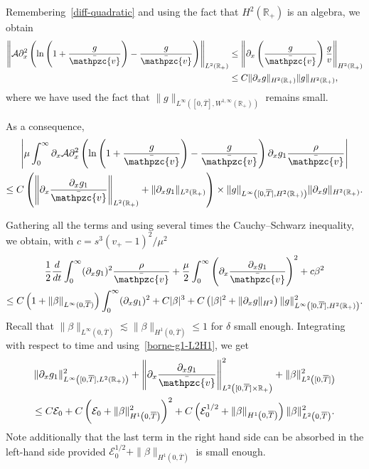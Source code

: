 \documentclass[AHL,Unicode,longabstracts,published]{cedram}
\newcommand{\R}{\mathbb{R}}
\newcommand{\p}{\partial}
\newcommand{\bv}{\bar{\mathpzc{v}}}
\newcommand{\cA}{\mathcal A}
\newcommand{\cE}{\mathcal E}
\begin{document}
\begin{itemize}
Remembering~\eqref{diff-quadratic} and using the fact that $H^2(\R_+)$ is an algebra, we obtain {
\begin{align*}
\left\| \cA \p_x^2 \left(\ln\left(1+ \frac{g}{\bv}\right) - \frac{g}{\bv}\right)\right\|_{L^2(\R_+)}
&\leq \left\| \p_x\left(\frac{g}{\bv}\right) \frac{g}{v}\right\|_{H^2(\R_+)}\\
&\leq C \|\p_x g\|_{H^2(\R_+)} \|g\|_{H^2(\R_+)},
\end{align*}
where we have used the fact that $\|g\|_{L^\infty([0,\overline{T}], W^{1,\infty}(\R_+))}$ remains small. }

As a consequence,
\begin{multline}\label{eq:nonlin-1}
 \left| \mu \int_0^\infty \p_x \cA \p_x^2 \left(\ln\left(1+ \frac{g}{\bv}\right) - \frac{g}{\bv}\right) \p_x g_1 \frac{\rho }{\bv}\right|  \\
\leq C\left(\left\| \p_x \frac{\p_x g_1}{\bv} \right\|_{L^2(\R_+)} + \|\p_x g_1\|_{L^2(\R_+)}\right)\times \| g\|_{L^\infty\left([0, \overline{T}], H^2(\R_+)\right)} \| \p_x g\|_{H^2(\R_+)}.
\end{multline}
\end{itemize}

Gathering all the terms and using several times the Cauchy--Schwarz inequality, we obtain, with $c=s^3(v_+-1)^2/\mu^2$
\begin{multline*}
\frac{1}{2}\frac{d}{dt}\int_0^\infty (\p_x g_1)^2 \frac{\rho}{\bv} + \frac{\mu}{2}\int_0^\infty\left(\p_x \frac{\p_x g_1}{\bv}\right)^2 + c \beta^2\\
\leq C \left(1+ \|\beta\|_{L^\infty(0,\overline{T})}\right)\int_0^\infty (\p_x g_1)^2 + C |\beta|^3 + C \left(|\beta|^2 + \| \p_x g \|_{H^2}\right)\|g\|_{L^\infty\left([0, \overline{T}], H^2(\R_+)\right)}^2.
\end{multline*}
Recall that $\|\beta\|_{L^\infty(0,\overline{T})}\lesssim \|\beta\|_{H^1(0,\overline{T})}\leq 1$ for $\delta$ small enough. Integrating with respect to time and using~\eqref{borne-g1-L2H1}, we get
\begin{multline}\label{est:b}
\|\p_x g_1\|_{L^\infty\left([0,\overline{T}], L^2(\R_+)\right)}^2 + \left\|\p_x \frac{\p_x g_1}{\bv}\right\|^2_{L^2\left([0,\overline{T}]\times \R_+\right)}+ \|\beta\|_{L^2\left([0,\overline{T}]\right)}^2\\
\leq C\cE_0 + C\left(\cE_0 + \|\beta\|_{H^1\left(0,\overline{T}\right)}^2\right)^2 + C\left(\cE_0^{1/2} + \|\beta\|_{H^1\left(0,\overline{T}\right)}\right)\|\beta\|_{L^2\left(0,\overline{T}\right)}^2.
\end{multline}
Note additionally that the last term in the right hand side can be absorbed in the left-hand side provided $\cE_0^{1/2} + \|\beta\|_{H^1(0,\overline{T})}$ is small enough.
\end{document}
